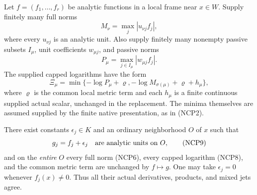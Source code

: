 Let $f=(f_1,\ldots,f_r)$ be analytic functions in a local frame
near $x\in W$.  Supply finitely many full norms
\[
 M_\nu=\max_j|u_{\nu j}f_j|,
 \tag{NCP6}
\]
where every $u_{\nu j}$ is an analytic unit.  Also supply finitely
many nonempty passive subsets $I_\mu$, unit coefficients
$w_{\mu j}$, and passive norms
\[
 P_\mu=\max_{j\in I_\mu}|w_{\mu j}f_j|.
 \tag{NCP7}
\]
The supplied capped logarithms have the form
\[
 \Xi_\mu=\min\{-\log P_\mu+\varrho,
                  -\log M_{\sigma(\mu)}+\varrho+h_\mu\},
 \tag{NCP8}
\]
where $\varrho$ is the common local metric term and each $h_\mu$
is a finite continuous supplied actual scalar, unchanged in the
replacement.  The minima themselves are assumed supplied by the
finite native presentation, as in (NCP2).

\begin{lemma}
There exist constants $\epsilon_j\in K$ and an ordinary neighborhood
$O$ of $x$ such that
\[
 g_j=f_j+\epsilon_j\quad\hbox{are analytic units on }O,
 \tag{NCP9}
\]
and on the \emph{entire} $O$ every full norm (NCP6), every capped
logarithm (NCP8), and the common metric term are unchanged by
$f\mapsto g$.  One may take $\epsilon_j=0$ whenever $f_j(x)\ne0$.
Thus all their actual derivatives, products, and mixed jets agree.
\end{lemma}

